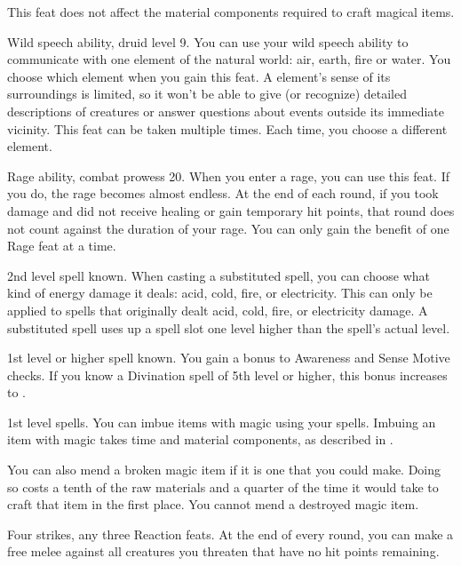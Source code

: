 This feat does not affect the material components required to craft magical items.

\featpres Wild speech ability, druid level 9.
\featben You can use your wild speech ability to communicate with one element of the natural world: air, earth, fire or water.
You choose which element when you gain this feat.
A element's sense of its surroundings is limited, so it won't be able to give (or recognize) detailed descriptions of creatures or answer questions about events outside its immediate vicinity.
 This feat can be taken multiple times.
Each time, you choose a different element.

\featpres Rage ability, combat prowess 20.
\featben When you enter a rage, you can use this feat. If you do, the rage becomes almost endless. At the end of each round, if you took damage and did not receive healing or gain temporary hit points, that round does not count against the duration of your rage.
 You can only gain the benefit of one Rage feat at a time.

\featpre 2nd level spell known.
\featben When casting a substituted spell, you can choose what kind of energy damage it deals: acid, cold, fire, or electricity.
This can only be applied to spells that originally dealt acid, cold, fire, or electricity damage.
A substituted spell uses up a spell slot one level higher than the spell's actual level.

\featpre 1st level or higher  spell known.
\featben You gain a  bonus to Awareness and Sense Motive checks.
If you know a Divination spell of 5th level or higher, this bonus increases to .

\featpre 1st level spells.
\featben You can imbue items with magic using your spells.
Imbuing an item with magic takes time and material components, as described in .

You can also mend a broken magic item if it is one that you could make.
Doing so costs a tenth of the raw materials and a quarter of the time it would take to craft that item in the first place.
You cannot mend a destroyed magic item.

\featpres Four strikes, any three Reaction feats.
\featben At the end of every round, you can make a free melee  against all creatures you threaten that have no hit points remaining.


